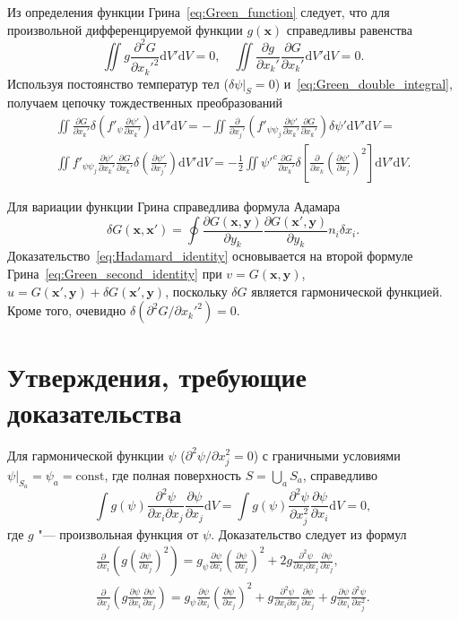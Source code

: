 \documentclass{article}
\theoremstyle{plain}
\newcommand{\dd}{\mathrm{d}}
\newcommand{\pder}[2][]{\frac{\partial#1}{\partial#2}}
\newcommand{\pderdual}[2][]{\frac{\partial^2#1}{\partial#2^2}}
\newcommand{\pderder}[3][]{\frac{\partial^2#1}{\partial#2\partial#3}}
\newcommand{\Pderdual}[2][]{\partial^2#1/\partial#2^2}
\newcommand{\bx}{\boldsymbol{x}}
\newcommand{\by}{\boldsymbol{y}}
\begin{document}
Из определения функции Грина~\eqref{eq:Green_function} следует,
что для произвольной дифференцируемой функции \(g(\bx)\) справедливы равенства
\begin{equation}\label{eq:Green_double_integral}
    \iint g\pderdual[G]{x_k'}\dd{V'}\dd{V} = 0, \quad
    \iint \pder[g]{x_k'}\pder[G]{x_k'}\dd{V'}\dd{V} = 0.
\end{equation}
Используя постоянство температур тел (\(\delta\psi|_S=0\)) и~\eqref{eq:Green_double_integral},
получаем цепочку тождественных преобразований
\begin{multline}\label{eq:variation_energy3}
    \iint \pder[G]{x_k'}\delta\left( f'_\psi\pder[\psi']{x_k'} \right) \dd{V'}\dd{V} =
    -\iint \pder{x_j'}\left( f'_{\psi\psi_j}\pder[\psi']{x_k'}\pder[G]{x_k'} \right)\delta\psi' \dd{V'}\dd{V} = \\
    \iint f'_{\psi\psi_j}\pder[\psi']{x_k'}\pder[G]{x_k'} \delta\left(\pder[\psi']{x_j'}\right) \dd{V'}\dd{V} =
    -\frac12\iint \psi'^c\pder[G]{x_k'} \delta\left[\pder{x_k}\left(\pder[\psi']{x_j}\right)^2\right] \dd{V'}\dd{V}.
\end{multline}

Для вариации функции Грина справедлива формула Адамара~\cite{Hadamard1908, Schiffer1958}
\begin{equation}\label{eq:Hadamard_identity}
    \delta{G}(\bx,\bx') = \oint\pder[G(\bx,\by)]{y_k}\pder[G(\bx',\by)]{y_k} n_i\delta{x_i}.
\end{equation}
Доказательство~\eqref{eq:Hadamard_identity} основывается на второй формуле Грина~\eqref{eq:Green_second_identity}
при \(v=G(\bx,\by)\), \(u=G(\bx',\by)+\delta{G}(\bx',\by)\), поскольку \(\delta{G}\) является гармонической функцией.
Кроме того, очевидно \(\delta(\Pderdual[G]{x_k'}) = 0\).

\section{Утверждения, требующие доказательства}

Для гармонической функции \(\psi\) (\(\Pderdual[\psi]{x_j} = 0\)) с граничными условиями
\(\psi|_{S_a} = \psi_a = \mathrm{const}\), где полная поверхность \(S=\bigcup_a S_a\), справедливо
\begin{equation}\label{eq:integral_mixed}
    \int g(\psi)\pderder[\psi]{x_i}{x_j}\pder[\psi]{x_j}\dd{V} = \int g(\psi)\pderdual[\psi]{x_j}\pder[\psi]{x_i}\dd{V} = 0,
\end{equation}
где \(g\) "--- произвольная функция от \(\psi\). Доказательство следует из формул
\begin{gather}
    \pder{x_i}\left( g \left(\pder[\psi]{x_j}\right)^2 \right) =
        g_\psi\pder[\psi]{x_i}\left(\pder[\psi]{x_j}\right)^2 + 2g\pderder[\psi]{x_i}{x_j}\pder[\psi]{x_j}, \\
    \pder{x_j}\left( g \pder[\psi]{x_i}\pder[\psi]{x_j} \right) =
        g_\psi\pder[\psi]{x_i}\left(\pder[\psi]{x_j}\right)^2 + g\pderder[\psi]{x_i}{x_j}\pder[\psi]{x_j} +
        g\pder[\psi]{x_i}\pderdual[\psi]{x_j}.
\end{gather}
\end{document}
